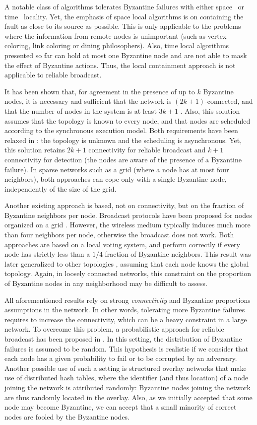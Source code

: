 \documentclass[a4paper,11pt]{article}
\begin{document}
A notable class of algorithms tolerates Byzantine failures with either space~\cite{MT07j,NA02c,SOM05c} or time~\cite{MT06cb,DMT11cb,DMT11j,DMT10cd,DMT10ca} locality. Yet, the emphasis of space local algorithms is on containing the fault as close to its source as possible. This is only applicable to the problems where the information from remote nodes is unimportant (such as vertex coloring, link coloring or dining philosophers). Also, time local algorithms presented so far can hold at most one Byzantine node and are not able to mask the effect of Byzantine actions. Thus, the local containment approach is not applicable to reliable broadcast.

It has been shown that, for agreement in the presence of up to $k$ Byzantine nodes, it is necessary and sufficient that the network is $(2k+1)$-connected, and that the number of nodes in the system is at least $3k+1$ \cite{D82j}. Also, this solution assumes that the topology is known to every node, and that nodes are scheduled according to the synchronous execution model.
Both requirements have been relaxed in \cite{NT09j}: the topology is unknown and the scheduling is asynchronous. Yet, this solution retains $2k+1$ connectivity for reliable broadcast and $k+1$ connectivity for detection (the nodes are aware of the presence of a Byzantine failure). In sparse networks such as a grid (where a node has at most four neighbors), both approaches can cope only with a single Byzantine node, independently of the size of the grid. 

Another existing approach is based, not on connectivity, but on the fraction of Byzantine neighbors per node. Broadcast protocols have been proposed for nodes organized on a grid \cite{K04c,BV05c}. However, the wireless medium typically induces much more than four neighbors per node, otherwise the broadcast does not work. Both approaches are based on a local voting system, and perform correctly if every node has strictly less than a $1/4$ fraction of Byzantine neighbors. This result was later generalized to other topologies \cite{PP05j}, assuming that each node knows the global topology. Again, in loosely connected networks, this constraint on the proportion of Byzantine nodes in any neighborhood may be difficult to assess.

All aforementioned results rely on strong \emph{connectivity} and Byzantine proportions assumptions in the network. In other words, tolerating more Byzantine failures requires to increase the connectivity, which can be a heavy constraint in a large network.
To overcome this problem, a probabilistic approach for reliable broadcast has been proposed in \cite{CtrZ}. In this setting, the distribution of Byzantine failures is assumed to be random. This hypothesis is realistic if we consider that each node has a given probability to fail or to be corrupted by an adversary. Another possible use of such a setting is structured overlay networks that make use of distributed hash tables, where the identifier (and thus location) of a node joining the network is attributed randomly: Byzantine nodes joining the network are thus randomly located in the overlay. Also, as we initially accepted that some node may become Byzantine, we can accept that a small minority of correct nodes are fooled by the Byzantine nodes.
\end{document}

